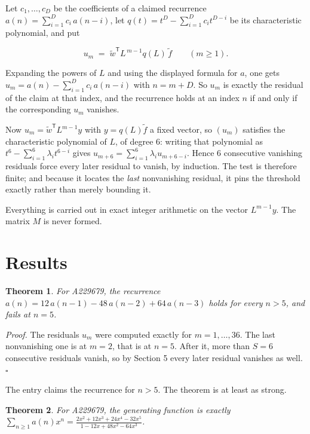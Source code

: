 \documentclass[11pt]{article}
\newtheorem{theorem}{Theorem}
\theoremstyle{definition}
\begin{document}
Let $c_1,\dots,c_D$ be the coefficients of a claimed recurrence $a(n) = \sum_{i=1}^{D} c_i\,a(n-i)$, let $q(t) = t^{D} - \sum_{i=1}^{D} c_i t^{D-i}$ be its characteristic polynomial, and put

\[u_m \;=\; \tilde w^{\mathsf T} L^{\,m-1} q(L)\,\tilde f \qquad (m \ge 1).\]

Expanding the powers of $L$ and using the displayed formula for $a$, one gets $u_m = a(n) - \sum_{i=1}^{D} c_i\,a(n-i)$ with $n = m + D$. So $u_m$ is exactly the residual of the claim at that index, and the recurrence holds at an index $n$ if and only if the corresponding $u_m$ vanishes.

Now $u_m = \tilde w^{\mathsf T} L^{m-1} y$ with $y = q(L)\tilde f$ a fixed vector, so $(u_m)$ satisfies the characteristic polynomial of $L$, of degree $6$: writing that polynomial as $t^{6} - \sum_{i=1}^{6} \lambda_i t^{6-i}$ gives $u_{m+6} = \sum_{i=1}^{6} \lambda_i u_{m+6-i}$. Hence $6$ consecutive vanishing residuals force every later residual to vanish, by induction. The test is therefore finite; and because it locates the {\itshape last} nonvanishing residual, it pins the threshold exactly rather than merely bounding it.

Everything is carried out in exact integer arithmetic on the vector $L^{m-1}y$. The matrix $M$ is never formed.

\section{Results}

\begin{theorem} For A229679, the recurrence $a(n) = 12\,a(n-1) - 48\,a(n-2) + 64\,a(n-3)$ holds for every $n > 5$, and fails at $n = 5$.\end{theorem}

{\itshape Proof.} The residuals $u_m$ were computed exactly for $m = 1,\dots,36$. The last nonvanishing one is at $m = 2$, that is at $n = 5$. After it, more than $S = 6$ consecutive residuals vanish, so by Section 5 every later residual vanishes as well. $\square$

The entry claims the recurrence for $n > 5$. The theorem is at least as strong.

\begin{theorem} For A229679, the generating function is exactly $\sum_{n\ge 1} a(n)x^n = \frac{2x^{2} + 12x^{3} + 24x^{4} - 32x^{5}}{1 - 12x + 48x^{2} - 64x^{3}}$.\end{theorem}
\end{document}
